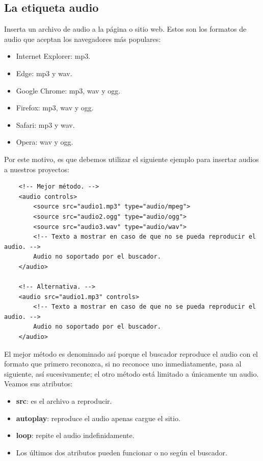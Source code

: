 \subsection{La etiqueta audio}
\hspace{0.55cm}Inserta un archivo de audio a la página o sitio web. Estos son los formatos de audio que aceptan los navegadores más populares:
\begin{itemize}
    \item Internet Explorer: mp3.
    \item Edge: mp3 y wav.
    \item Google Chrome: mp3, wav y ogg.
    \item Firefox: mp3, wav y ogg.
    \item Safari: mp3 y wav.
    \item Opera: wav y ogg.
\end{itemize}

Por este motivo, es que debemos utilizar el siguiente ejemplo para insertar audios a nuestros proyectos:
\begin{lstlisting}
    <!-- Mejor método. -->
    <audio controls>
        <source src="audio1.mp3" type="audio/mpeg">
        <source src="audio2.ogg" type="audio/ogg">
        <source src="audio3.wav" type="audio/wav">
        <!-- Texto a mostrar en caso de que no se pueda reproducir el audio. -->
        Audio no soportado por el buscador.
    </audio>

    <!-- Alternativa. -->
    <audio src="audio1.mp3" controls>
        <!-- Texto a mostrar en caso de que no se pueda reproducir el audio. -->
        Audio no soportado por el buscador.
    </audio>
\end{lstlisting}

El mejor método es denominado así porque el buscador reproduce el audio con el formato que primero reconozca, si no reconoce uno inmediatamente, pasa al siguiente, así sucesivamente; el otro método está limitado a únicamente un audio. Veamos sus atributos:
\begin{itemize}
    \item \textbf{src}: es el archivo a reproducir.
    \item \textbf{autoplay}: reproduce el audio apenas cargue el sitio.
    \item \textbf{loop}: repite el audio indefinidamente.
    \item Los últimos dos atributos pueden funcionar o no según el buscador.
\end{itemize}

